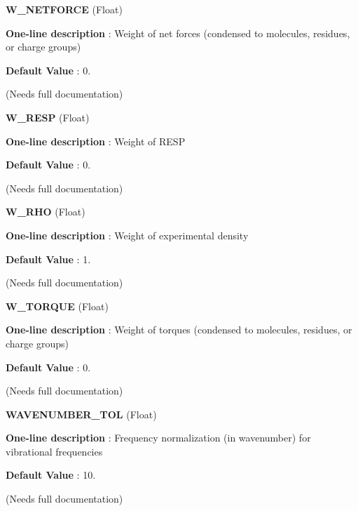 \begin{DoxyItemize}
\item {\bfseries  W\-\_\-\-N\-E\-T\-F\-O\-R\-C\-E } (Float) \par
{\bfseries  One-\/line description }\-: Weight of net forces (condensed to molecules, residues, or charge groups) \par
{\bfseries  Default Value }\-: 0. \par
(Needs full documentation)\end{DoxyItemize}
\begin{DoxyItemize}
\item {\bfseries  W\-\_\-\-R\-E\-S\-P } (Float) \par
{\bfseries  One-\/line description }\-: Weight of R\-E\-S\-P \par
{\bfseries  Default Value }\-: 0. \par
(Needs full documentation)\end{DoxyItemize}
\begin{DoxyItemize}
\item {\bfseries  W\-\_\-\-R\-H\-O } (Float) \par
{\bfseries  One-\/line description }\-: Weight of experimental density \par
{\bfseries  Default Value }\-: 1. \par
(Needs full documentation)\end{DoxyItemize}
\begin{DoxyItemize}
\item {\bfseries  W\-\_\-\-T\-O\-R\-Q\-U\-E } (Float) \par
{\bfseries  One-\/line description }\-: Weight of torques (condensed to molecules, residues, or charge groups) \par
{\bfseries  Default Value }\-: 0. \par
(Needs full documentation)\end{DoxyItemize}
\begin{DoxyItemize}
\item {\bfseries  W\-A\-V\-E\-N\-U\-M\-B\-E\-R\-\_\-\-T\-O\-L } (Float) \par
{\bfseries  One-\/line description }\-: Frequency normalization (in wavenumber) for vibrational frequencies \par
{\bfseries  Default Value }\-: 10. \par
(Needs full documentation)\end{DoxyItemize}
